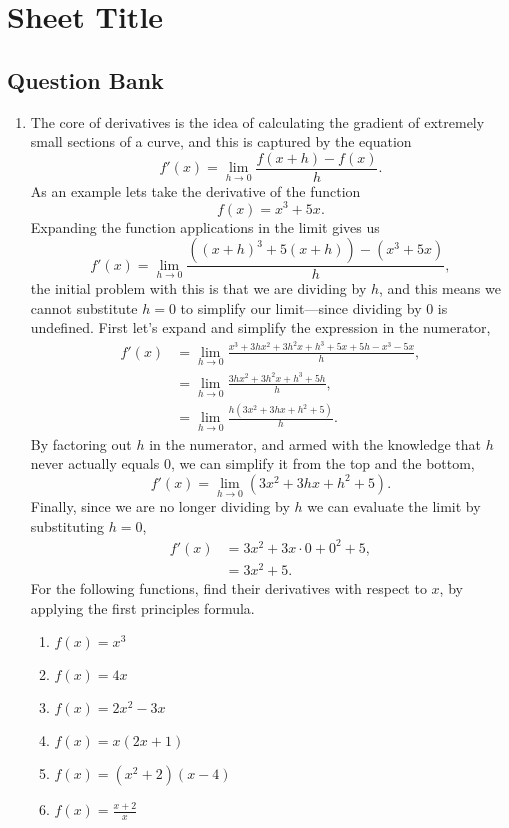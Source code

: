 \documentclass[a4paper,12pt]{article}
\begin{document}
\section*{Sheet Title}

\subsection*{Question Bank}

\begin{enumerate}
\item The core of derivatives is the idea of calculating the gradient of 
extremely small sections of a curve, and this is captured by the equation
$$f'(x) = \lim_{h \to 0}\frac{f(x + h) - f(x)}{h}.$$
As an example lets take the derivative of the function 
$$f(x) = x^3 + 5x.$$
Expanding the function applications in the limit gives us
$$f'(x) = \lim_{h \to 0}\frac{\left((x+h)^3 + 5(x + h)\right) - \left(x^3 + 5x\right)}{h},$$
the initial problem with this is that we are dividing by $h$, and this 
means we cannot substitute $h = 0$ to simplify our limit---since dividing 
by 0 is undefined. First let's expand and simplify the expression in the 
numerator,
\begin{align*}
f'(x) &= \lim_{h \to 0}\frac{x^3 + 3hx^2 + 3h^2x + h^3 + 5x + 5h - x^3 - 5x}{h}, \\
 &= \lim_{h \to 0}\frac{3hx^2 + 3h^2x + h^3 + 5h}{h}, \\
 &= \lim_{h \to 0}\frac{h\left(3x^2 + 3hx + h^2 + 5\right)}{h}.
\end{align*}
By factoring out $h$ in the numerator, and armed with the knowledge that $h$ 
never actually equals 0, we can simplify it from the top and the bottom,
$$f'(x) = \lim_{h\to 0}\left(3x^2 + 3hx + h^2 + 5\right).$$
Finally, since we are no longer dividing by $h$ we can evaluate the limit 
by substituting $h = 0$,
\begin{align*}
f'(x) &= 3x^2 + 3x\cdot 0 + 0^2 + 5, \\
&= 3x^2 + 5.
\end{align*}
For the following functions, find their derivatives with respect to $x$,
by applying the first principles formula.
    \begin{multicols}{2}
    \begin{enumerate}
    \item $f(x) = x^3$
    \item $f(x) = 4x$
    \item $f(x) = 2x^2 - 3x$
    \item $f(x) = x(2x + 1)$
    \item $f(x) = (x^2 + 2)(x - 4)$
    \item $f(x) = \frac{x + 2}{x}$
    \end{enumerate}
    \end{multicols}


\end{enumerate}
\end{document}
